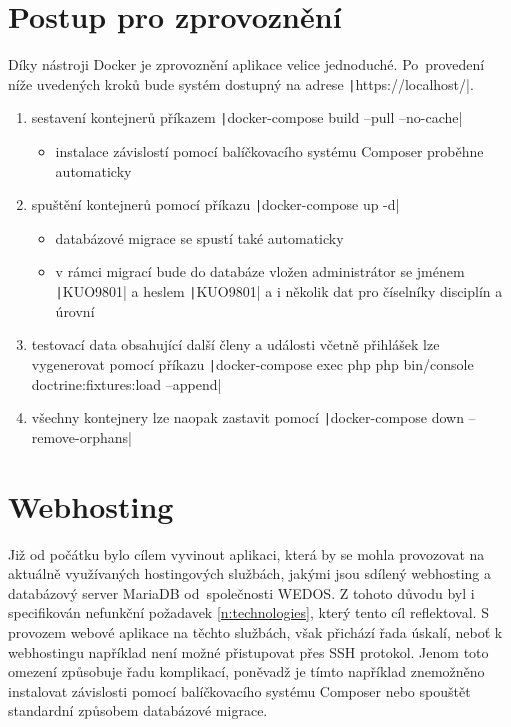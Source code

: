 \section{Postup pro zprovoznění}\label{deploy-steps}
Díky nástroji Docker je zprovoznění aplikace velice jednoduché. Po~provedení níže uvedených kroků bude systém dostupný na adrese \texttt|https://localhost/|.

\begin{enumerate}
	\item sestavení kontejnerů příkazem \texttt|docker-compose build --pull --no-cache|
	\begin{itemize}
		\item instalace závislostí pomocí balíčkovacího systému Composer proběhne automaticky
	\end{itemize}
	\item spuštění kontejnerů pomocí příkazu \texttt|docker-compose up -d|
	\begin{itemize}
		\item databázové migrace se spustí také automaticky
		\item v rámci migrací bude do databáze vložen administrátor se jménem \texttt|KUO9801| a heslem \texttt|KUO9801| a i několik dat pro číselníky disciplín a úrovní
	\end{itemize}
	\item testovací data obsahující další členy a události včetně přihlášek lze vygenerovat pomocí příkazu \texttt|docker-compose exec php php bin/console doctrine:fixtures:load --append|
	\item všechny kontejnery lze naopak zastavit pomocí \texttt|docker-compose down --remove-orphans|
\end{enumerate}

\section{Webhosting}
Již od počátku bylo cílem vyvinout aplikaci, která by se mohla provozovat na aktuálně využívaných hostingových službách, jakými jsou sdílený webhosting a databázový server MariaDB od~společnosti WEDOS. Z tohoto důvodu byl i specifikován nefunkční požadavek \ref{n:technologies}, který tento cíl reflektoval. S provozem webové aplikace na těchto službách, však přichází řada úskalí, neboť k webhostingu například není možné přistupovat přes SSH protokol. Jenom toto omezení způsobuje řadu komplikací, poněvadž je tímto například znemožněno instalovat závislosti pomocí balíčkovacího systému Composer nebo spouštět standardní způsobem databázové migrace.

